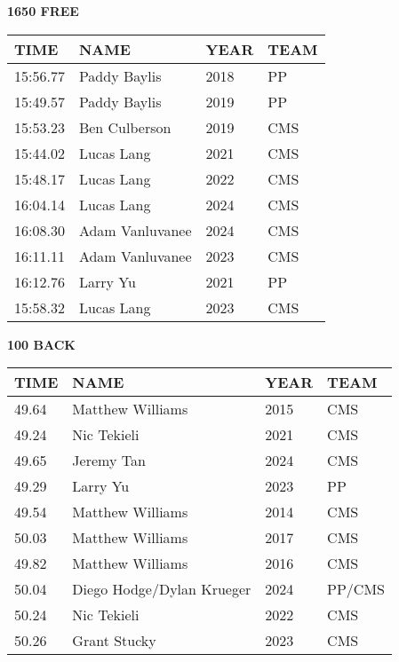 \begin{table}[H]
\centering
\begin{minipage}[t]{0.48\textwidth}
\centering
\textbf{1650 FREE}\\[0.1cm]
\begin{tabular}{@{}p{1.8cm}p{2.8cm}p{1.2cm}p{1.4cm}@{}}
\hline
    \textbf{TIME} & \textbf{NAME} & \textbf{YEAR} & \textbf{TEAM} \\
\hline
    15:56.77 & Paddy Baylis & 2018 & PP \\
    15:49.57 & Paddy Baylis & 2019 & PP \\
    15:53.23 & Ben Culberson & 2019 & CMS \\
    15:44.02 & Lucas Lang & 2021 & CMS \\
    15:48.17 & Lucas Lang & 2022 & CMS \\
    16:04.14 & Lucas Lang & 2024 & CMS \\
    16:08.30 & Adam Vanluvanee & 2024 & CMS \\
    16:11.11 & Adam Vanluvanee & 2023 & CMS \\
    16:12.76 & Larry Yu & 2021 & PP \\
    15:58.32 & Lucas Lang & 2023 & CMS \\
\hline
\end{tabular}
\end{minipage}\hfill
\begin{minipage}[t]{0.48\textwidth}
\centering
\textbf{100 BACK}\\[0.1cm]
\begin{tabular}{@{}p{1.8cm}p{2.8cm}p{1.2cm}p{1.4cm}@{}}
\hline
    \textbf{TIME} & \textbf{NAME} & \textbf{YEAR} & \textbf{TEAM} \\
\hline
    49.64 & Matthew Williams & 2015 & CMS \\
    49.24 & Nic Tekieli & 2021 & CMS \\
    49.65 & Jeremy Tan & 2024 & CMS \\
    49.29 & Larry Yu & 2023 & PP \\
    49.54 & Matthew Williams & 2014 & CMS \\
    50.03 & Matthew Williams & 2017 & CMS \\
    49.82 & Matthew Williams & 2016 & CMS \\
    50.04 & Diego Hodge/Dylan Krueger & 2024 & PP/CMS \\
    50.24 & Nic Tekieli & 2022 & CMS \\
    50.26 & Grant Stucky & 2023 & CMS \\
\hline
\end{tabular}
\end{minipage}
\end{table}

